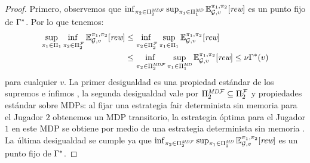 \begin{proof}
  Primero, observemos que $\inf_{\pi_{2} \in \Pi^{\textit{MD}\mathcal{F}}_{2}}  \sup_{\pi_{1} \in \Pi^{\textit{MD}}_{1}} \mathbb{E}^{\pi_{1}, \pi_{2}}_{\mathcal{G},v}[\textit{rew}]$
  es un punto fijo de $\Gamma^*$.  Por lo que tenemos:
   \begin{align*}	
        \adjustlimits \sup_{\strat{1} \in \Strategies{1}}   \inf_{\strat{2} \in \FairStrats{2}}  \Expect{\strat{1}}{\strat{2}}_{\StochG,v}[\Rewards]
        & \leq \adjustlimits \inf_{\strat{2} \in \FairStrats{2}} \sup_{\strat{1} \in \Strategies{1}} \Expect{\strat{1}}{\strat{2}}_{\StochG,v}[\Rewards] \\
        &   \leq \adjustlimits  \inf_{\strat{2} \in \DetMemorylessFairStrats{2}}  \sup_{\strat{1} \in \DetMemorylessStrats{1}} \Expect{\strat{1}}{\strat{2}}_{\StochG,v}[\Rewards] 
         \leq   \nu \Bellman(v) 
  \end{align*} 
  para cualquier $v$. La primer desigualdad es una propiedad estándar de los supremos e ínfimos \cite{Kucera2011}, la segunda desigualdad vale por
  $\Pi^{\textit{MD}\mathcal{F}}_{2} \subseteq \Pi^{\mathcal{F}}_{2}$  y propiedades estándar sobre MDPs: al fijar una estrategia fair determinista sin memoria para el Jugador $2$ obtenemos un MDP transitorio, la estrategia óptima para el Jugador $1$ en este MDP se obtiene por medio de una estrategia determinista sin memoria \cite{Kallenberg83}. La última desigualdad se cumple ya que  $\inf_{\pi_{2} \in \Pi^{\textit{MD}\mathcal{F}}_{2}}  \sup_{\pi_{1} \in \Pi^{\textit{MD}}_{1}} \mathbb{E}^{\pi_{1}, \pi_{2}}_{\mathcal{G},v}[\textit{rew}]$ es 
  un punto fijo de $\Gamma^*$. 
  

\end{proof}
